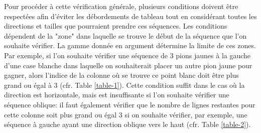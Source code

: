 \documentclass[a4paper, 11pt, oneside]{article}
\begin{document}
Pour procéder à cette vérification générale, plusieurs conditions doivent être respectées afin d'éviter les débordements de tableau tout en considérant toutes les directions et tailles que pourraient prendre ces séquences. Les conditions dépendent de la "zone" dans laquelle se trouve le début de la séquence que l'on souhaite vérifier. La gamme donnée en argument détermine la limite de ces zones. Par exemple, si l'on souhaite vérifier une séquence de 3 pions jaunes à la gauche d'une case blanche dans laquelle on souhaiterait placer un autre pion jaune pour gagner, alors l'indice de la colonne où se trouve ce point blanc doit être plus grand ou égal à 3 (cfr. Table \ref{table-1}). Cette condition suffit dans le cas où la direction est horizontale, mais est insuffisante si l'on souhaite vérifier une séquence oblique: il faut également vérifier que le nombre de lignes restantes pour cette colonne soit plus grand ou égal 3 si on souhaite vérifier, par exemple, une séquence à gauche ayant une direction oblique vers le haut (cfr. Table \ref{table-2}).
\end{document}
